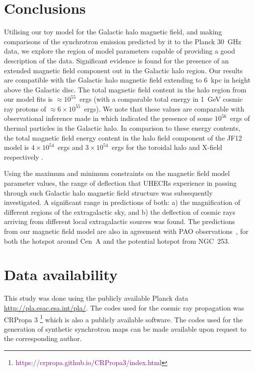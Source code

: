 \documentclass[usenatbib]{mnras}
\begin{document}
\section{Conclusions}
\label{Conclusions}

Utilising our toy model for the Galactic halo magnetic field, and making comparisons of the synchrotron emission predicted by it to the Planck 30~GHz data, we explore the region of model parameters capable of providing a good description of the data. Significant evidence is found for the presence of an extended magnetic field component out in the Galactic halo region. Our results are compatible with the Galactic halo magnetic field extending to 6~kpc in height above the Galactic disc. The total magnetic field content in the halo region from our model fits is $\approx 10^{55}$~ergs (with a comparable total energy in 1~GeV cosmic ray protons of $\approx 6\times 10^{55}$~ergs). We note that these values are comparable with observational inference made in \cite{eROSITA} which indicated the presence of some $10^{56}$~ergs of thermal particles in the Galactic halo.
In comparison to these energy contents, the total magnetic field energy content in the halo field component of the JF12 model is $4\times 10^{54}$~ergs and $3\times  10^{54}$~ergs for the toroidal halo and X-field respectively \citep{Taylor_2019}.

Using the maximum and minimum constraints on the magnetic field model parameter values, the range of deflection that UHECRs experience in passing through such Galactic halo magnetic field structure was subsequently investigated. A significant range in predictions of both: a) the magnification of different regions of the extragalactic sky, and b) the deflection of cosmic rays arriving from different local extragalactic sources was found. The predictions from our magnetic field model are also in agreement with PAO observations~\citep{Auger_Starburst2018,Auger_ICRC_2021}, for both the hotspot around Cen~A and the potential hotspot from NGC~253.

\section*{Data availability}
This study was done using the publicly available Planck data \hyperlink{Planck}{http://pla.esac.esa.int/pla/}. The codes used for the cosmic ray propagation was CRPropa 3 \citep{CRPropa3_2016}\footnote{\textcolor{purple}{https://crpropa.github.io/CRPropa3/index.html}} which is also a publicly available software. The codes used for the generation of synthetic synchrotron maps can be made available upon request to the corresponding author. 
\end{document}
